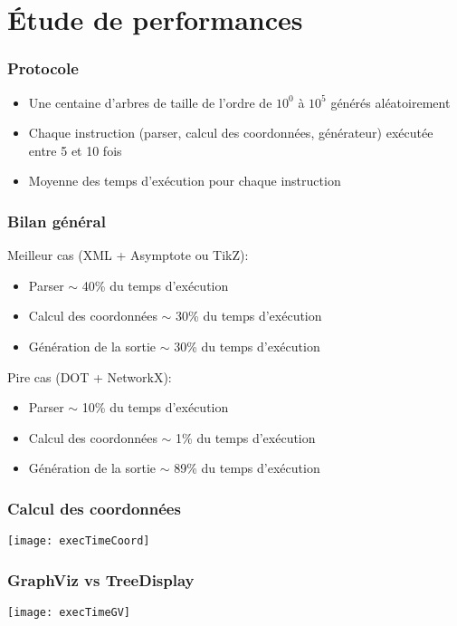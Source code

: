 \section{Étude de performances}

\begin{frame}
	\frametitle{Protocole}
	\begin{itemize}
		\item Une centaine d'arbres de taille de l'ordre de $10^{0}$ à $10^{5}$ générés aléatoirement
		\item Chaque instruction (parser, calcul des coordonnées, générateur) exécutée entre 5 et 10 fois
		\item Moyenne des temps d'exécution pour chaque instruction
	\end{itemize}
\end{frame}

\begin{frame}
	\frametitle{Bilan général}
	Meilleur cas (XML + Asymptote ou TikZ):
	\begin{itemize}
		\item Parser $\sim$ 40\% du temps d'exécution
		\item Calcul des coordonnées $\sim$ 30\% du temps d'exécution
		\item Génération de la sortie $\sim$ 30\% du temps d'exécution
	\end{itemize}
	Pire cas (DOT + NetworkX):
	\begin{itemize}
		\item Parser $\sim$ 10\% du temps d'exécution
		\item Calcul des coordonnées $\sim$ 1\% du temps d'exécution
		\item Génération de la sortie $\sim$ 89\% du temps d'exécution
	\end{itemize}
\end{frame}

\begin{frame}
	\frametitle{Calcul des coordonnées}
	\begin{center}
	\texttt{[image: execTimeCoord]}
	\end{center}
\end{frame}

\begin{frame}
	\frametitle{GraphViz vs TreeDisplay}
	\begin{center}
	\texttt{[image: execTimeGV]}
	\end{center}
\end{frame}



